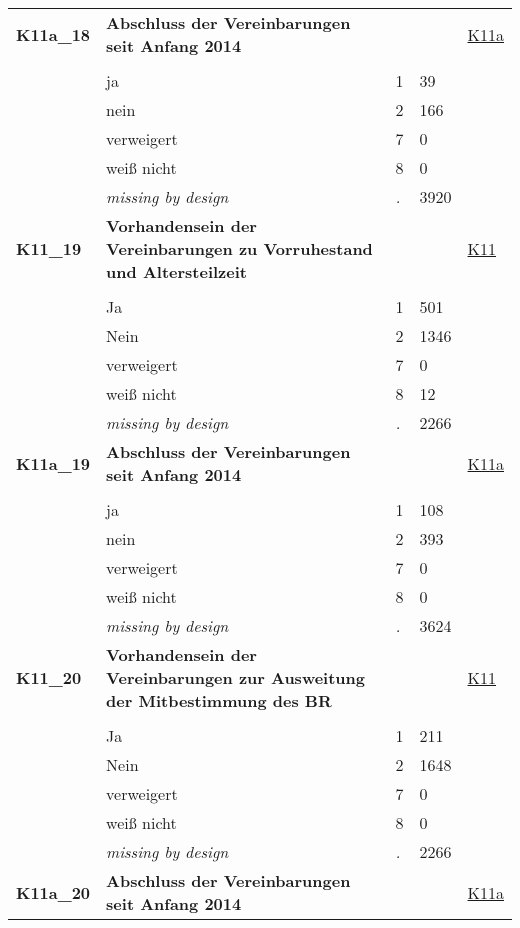 \begin{longtable}{| L{2.65cm} | L{8cm} | C{1.5cm} | R{1.25cm} | C{2.25cm}  |}
   \midrule
\textbf{K11a\_18}\label{var:K11a:18} & \textbf{Abschluss der Vereinbarungen seit Anfang 2014} &  &  & \hyperref[K11a]{K11a} \\ 
   &  &  &  &  \\ 
   & ja & 1 & 39 &  \\ 
   & nein & 2 & 166 &  \\ 
   & verweigert & 7 & 0 &  \\ 
   & weiß nicht & 8 & 0 &  \\ 
   & \textit{missing by design} & \textit{.} & 3920 &  \\ 
   \midrule
\textbf{K11\_19}\label{var:K11:19} & \textbf{Vorhandensein der Vereinbarungen zu Vorruhestand und Altersteilzeit} &  &  & \hyperref[K11]{K11} \\ 
   &  &  &  &  \\ 
   & Ja & 1 & 501 &  \\ 
   & Nein & 2 & 1346 &  \\ 
   & verweigert & 7 & 0 &  \\ 
   & weiß nicht & 8 & 12 &  \\ 
   & \textit{missing by design} & \textit{.} & 2266 &  \\ 
   \midrule
\textbf{K11a\_19}\label{var:K11a:19} & \textbf{Abschluss der Vereinbarungen seit Anfang 2014} &  &  & \hyperref[K11a]{K11a} \\ 
   &  &  &  &  \\ 
   & ja & 1 & 108 &  \\ 
   & nein & 2 & 393 &  \\ 
   & verweigert & 7 & 0 &  \\ 
   & weiß nicht & 8 & 0 &  \\ 
   & \textit{missing by design} & \textit{.} & 3624 &  \\ 
   \midrule
\textbf{K11\_20}\label{var:K11:20} & \textbf{Vorhandensein der Vereinbarungen zur Ausweitung der Mitbestimmung des BR} &  &  & \hyperref[K11]{K11} \\ 
   &  &  &  &  \\ 
   & Ja & 1 & 211 &  \\ 
   & Nein & 2 & 1648 &  \\ 
   & verweigert & 7 & 0 &  \\ 
   & weiß nicht & 8 & 0 &  \\ 
   & \textit{missing by design} & \textit{.} & 2266 &  \\ 
   \midrule
\textbf{K11a\_20}\label{var:K11a:20} & \textbf{Abschluss der Vereinbarungen seit Anfang 2014} &  &  & \hyperref[K11a]{K11a} \\ 

\end{longtable}
